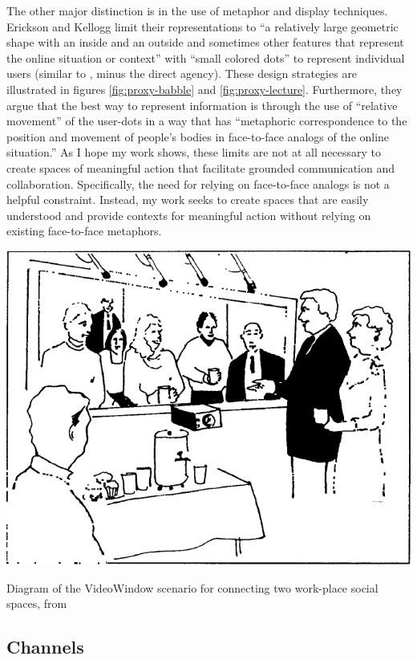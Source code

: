 The other major distinction is in the use of metaphor and display techniques. Erickson and Kellogg limit their representations to ``a relatively large geometric shape with an inside and an outside and sometimes other features that represent the online situation or context'' \citep{Erickson:2003td} with ``small colored dots'' to represent individual users (similar to \citep{Viegas:1999kv}, minus the direct agency). These design strategies are illustrated in figures \ref{fig:proxy-babble} and \ref{fig:proxy-lecture}. Furthermore, they argue that the best way to represent information is through the use of ``relative movement'' of the user-dots in a way that has ``metaphoric correspondence to the position and movement of people's bodies in face-to-face analogs of the online situation.'' \citep{Erickson:2003td} As I hope my work shows, these limits are not at all necessary to create spaces of meaningful action that facilitate grounded communication and collaboration. Specifically, the need for relying on face-to-face analogs is not a helpful constraint. Instead, my work seeks to create spaces that are easily understood and provide contexts for meaningful action without relying on existing face-to-face metaphors.

\begin{marginfigure}
	\includegraphics{figures/videowindow.png}
	\caption{Diagram of the VideoWindow scenario for connecting two work-place social spaces, from \citep{Fish:1990fn}}
	\label{fig:videowindow}
\end{marginfigure}


\subsection{Channels}


